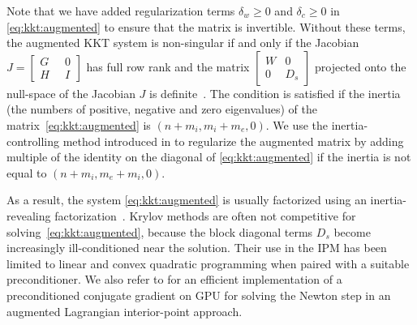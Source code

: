 Note that we have added regularization terms $\delta_w \geq 0$
and $\delta_c \geq 0$ in \eqref{eq:kkt:augmented} to ensure that the
matrix is invertible.
Without these terms, the augmented KKT system is non-singular
if and only if the Jacobian $J = \begin{bmatrix} G \; &\; 0 \\ H \;&\; I \end{bmatrix}$
has full row rank and the matrix $\begin{bmatrix} W  & 0 \\ 0 & D_s \end{bmatrix}$
projected onto the null-space of the Jacobian $J$ is definite~\cite{benzi2005numerical}.
The condition is satisfied if the inertia (the numbers
of positive, negative and zero eigenvalues) of the matrix~\eqref{eq:kkt:augmented} is $(n + m_i, m_i + m_e, 0)$.
We use the inertia-controlling method introduced in \cite[Section 3.1]{wachter2006implementation}
to regularize the augmented matrix by adding multiple of the identity
on the diagonal of \eqref{eq:kkt:augmented} if the inertia is not equal to $(n+m_i, m_e+m_i, 0)$.

As a result, the system \eqref{eq:kkt:augmented} is usually factorized using
an inertia-revealing \lblt factorization~\cite{duff1983multifrontal}.
Krylov methods are often not competitive for solving~\eqref{eq:kkt:augmented},
because the block diagonal terms $D_s$ become increasingly
ill-conditioned near the solution. Their use in the IPM has been limited to
linear and convex quadratic programming \cite{gondzio-2012} when paired
with a suitable preconditioner. We also refer to \cite{cao2016augmented}
for an efficient implementation of a preconditioned conjugate gradient
on GPU for solving the Newton step in an augmented Lagrangian interior-point
approach.


